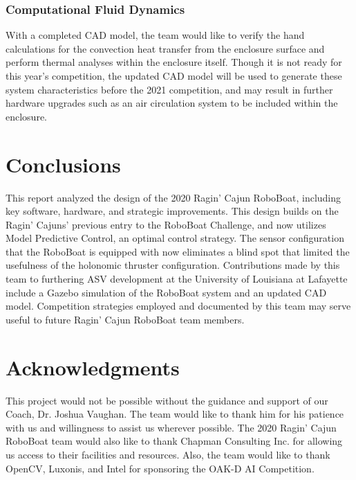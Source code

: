 \documentclass[letterpaper, 12 pt, conference]{ieeeconf}
\begin{document}
\subsubsection{Computational Fluid Dynamics}
With a completed CAD model, the team would like to verify the hand calculations for the convection heat transfer from the enclosure surface and perform thermal analyses within the enclosure itself. Though it is not ready for this year's competition, the updated CAD model will be used to generate these system characteristics before the 2021 competition, and may result in further hardware upgrades such as an air circulation system to be included within the enclosure.

\section{Conclusions}
This report analyzed the design of the 2020 Ragin' Cajun RoboBoat, including key software, hardware, and strategic improvements. This design builds on the Ragin' Cajuns' previous entry to the RoboBoat Challenge, and now utilizes Model Predictive Control, an optimal control strategy. The sensor configuration that the RoboBoat is equipped with now eliminates a blind spot that limited the usefulness of the holonomic thruster configuration. Contributions made by this team to furthering ASV development at the University of Louisiana at Lafayette include a Gazebo simulation of the RoboBoat system and an updated CAD model. Competition strategies employed and documented by this team may serve useful to future Ragin' Cajun RoboBoat team members.

\section{Acknowledgments}
This project would not be possible without the guidance and support of our Coach, Dr. Joshua Vaughan. The team would like to thank him for his patience with us and willingness to assist us wherever possible. The 2020 Ragin' Cajun RoboBoat team would also like to thank Chapman Consulting Inc. for allowing us access to their facilities and resources. Also, the team would like to thank OpenCV, Luxonis, and Intel for sponsoring the OAK-D AI Competition.


\end{document}
